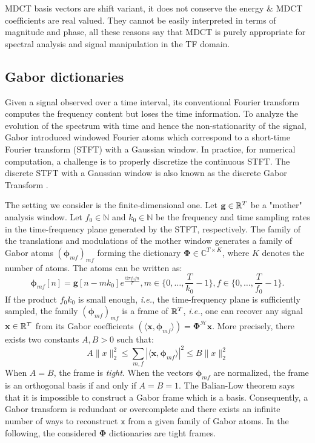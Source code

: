 MDCT basis vectors are shift variant, it does not conserve the energy \& MDCT coefficients are real valued. They cannot be easily interpreted in terms of magnitude and phase, all these reasons say that MDCT is purely appropriate for spectral analysis and signal manipulation in the TF domain.

\subsection{Gabor dictionaries}
Given a signal observed over a time interval, its conventional Fourier transform computes the frequency content but loses the time information. To analyze the evolution of the spectrum with time and hence the non-stationarity of the signal, Gabor introduced windowed Fourier atoms which correspond to a short-time Fourier transform (STFT) with a Gaussian window. In practice, for numerical computation, a challenge is to properly discretize the continuous STFT. The discrete STFT with a Gaussian window is also known as the discrete Gabor Transform \cite{gabor1946theory}.

The setting we consider is the finite-dimensional one. Let $\mathbf{g}\in \mathbb{R}^{T}$ be a "mother" analysis window. Let $f_0\in \mathbb{N}$ and $k_0\in \mathbb{N}$ be the frequency and time sampling rates in the time-frequency plane generated by the STFT, respectively. The family of the translations and modulations of the mother window generates a family of Gabor atoms $(\mathbf{\phi}_{mf})_{mf}$ forming the dictionary $\mathbf{\Phi}\in \mathbb{C}^{T\times K}$, where $K$ denotes the number of atoms. The atoms can be written as:
\begin{equation} \label{eq_gabor_atoms}
	\mathbf{\phi}_{mf}[n] = \mathbf{g}[n-mk_0]e^{\frac{i2\pi f_0 fn}{T}}, m\in \{0,\dots ,\frac{T}{k_0}-1\}, f\in \{0,\dots ,\frac{T}{f_0}-1\}.
\end{equation}
If the product $f_0k_0$ is small enough, \textit{i.e.}, the time-frequency plane is sufficiently sampled, the family $(\mathbf{\phi}_{mf})_{mf}$ is a frame of $\mathbb{R}^T$, \textit{i.e.}, one can recover any signal $\mathbf{x}\in \mathbb{R}^T$ from its Gabor coefficients $(\langle \mathbf{x}, \mathbf{\phi}_{mf}\rangle)=\mathbf{\Phi}^{\mathcal{H}}\mathbf{x}$. More precisely, there exists two constants $A, B > 0$ such that:
\begin{equation} \label{eq_frame}
	A\|x\|_2^2 \leq \sum_{m,f}|\langle \mathbf{x}, \mathbf{\phi}_{mf}\rangle|^2\leq B\|x\|_2^2   
\end{equation}
When $A=B$, the frame is \textit{tight}. When the vectors $\mathbf{\phi}_{mf}$ are normalized, the frame is an orthogonal basis if and only if $A=B=1$. The Balian-Low theorem says that it is impossible to construct a Gabor frame which is a basis. Consequently, a Gabor transform is redundant or overcomplete and there exists an infinite number of ways to reconstruct $\mathtt{x}$ from a given family of Gabor atoms. In the following, the considered $\mathbf{\Phi}$ dictionaries are tight frames.

